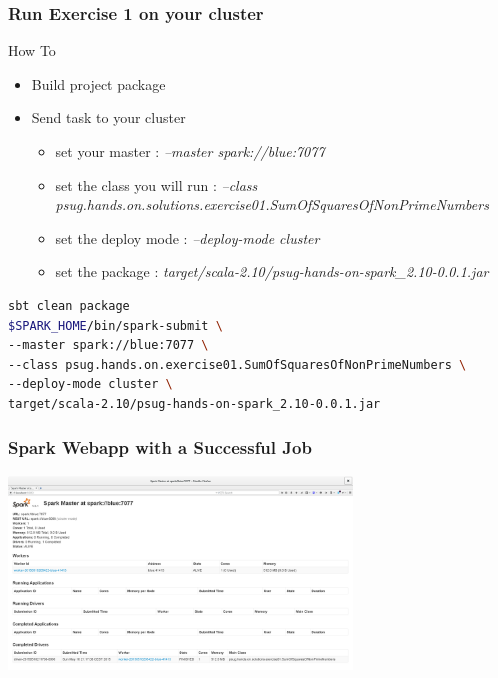 \documentclass[slidetop,9pt,utf8]{beamer}
\begin{document}
\begin{frame}[fragile]

  \frametitle{Run Exercise 1 on your cluster}

  \begin{block}{How To}
    \begin{itemize}
      \item Build project package
      \item Send task to your cluster
      \begin{itemize}
        \item set your master : \textit{--master spark://blue:7077}
        \item set the class you will run : \textit{--class psug.hands.on.solutions.exercise01.SumOfSquaresOfNonPrimeNumbers}
        \item set the deploy mode : \textit{--deploy-mode cluster}
        \item set the package : \textit{target/scala-2.10/psug-hands-on-spark\_2.10-0.0.1.jar}
      \end{itemize}
    \end{itemize}
  \end{block}

  \begin{lstlisting}[language=bash, style=terminal-large]
sbt clean package
$SPARK_HOME/bin/spark-submit \ 
--master spark://blue:7077 \ 
--class psug.hands.on.exercise01.SumOfSquaresOfNonPrimeNumbers \
--deploy-mode cluster \ 
target/scala-2.10/psug-hands-on-spark_2.10-0.0.1.jar
  \end{lstlisting} 

\end{frame}

\begin{frame}

  \frametitle{Spark Webapp with a Successful Job}

  \includegraphics[width=345px]{images/spark_webapp_driver_success.png}

\end{frame}
\end{document}
